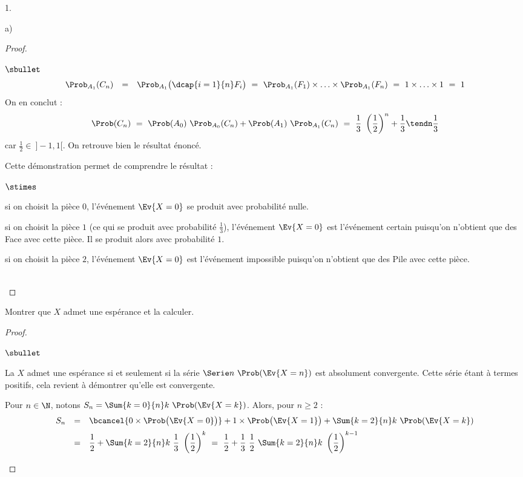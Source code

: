 \begin{noliste}{1.}
\begin{noliste}{a)}
\begin{proof}
\begin{remarkL}{.98}
\begin{noliste}{$\sbullet$}
\[\begin{array}{rcl}
            \Prob_{A_1}( C_n ) & = & \Prob_{A_1}\big( \dcap{i=1}{n} F_i
            \big) \ = \ \Prob_{A_1}(F_1) \times \ldots \times \Prob_{A_1}(F_n)
            \ = \ 1 \times \ldots \times 1 \ = \ 1
          \end{array}
          \]
          On en conclut :
          \[
          \Prob(C_n) \ = \ \Prob(A_0) \ \Prob_{A_0}(C_n) + \Prob(A_1)
          \ \Prob_{A_1}(C_n) \ = \ \dfrac{1}{3} \ \left( \dfrac{1}{2}
          \right)^n + \dfrac{1}{3} \tendn \dfrac{1}{3}
          \]
          car $\frac{1}{2} \in \ ]-1, 1[$. On retrouve bien le
          résultat énoncé.
        \item Cette démonstration permet de comprendre le résultat :
          \begin{noliste}{$\stimes$}
          \item si on choisit la pièce $0$, l'événement
            $\Ev{X = 0}$ se produit avec probabilité nulle.
          \item si on choisit la pièce $1$ (ce qui se produit avec
            probabilité $\frac{1}{3}$), l'événement $\Ev{X = 0}$ est
            l'événement certain puisqu'on n'obtient que des Face avec
            cette pièce. Il se produit alors avec probabilité $1$.
          \item si on choisit la pièce $2$, l'événement $\Ev{X = 0}$
            est l'événement impossible puisqu'on n'obtient que des
            Pile avec cette pièce.
          \end{noliste}
        \end{noliste}       
      \end{remarkL}~\\[-1.4cm]
    \end{proof}
  \end{noliste}

\item Montrer que $X$ admet une espérance et la calculer.

  \begin{proof}~%
    \begin{noliste}{$\sbullet$}
    \item La \var $X$ admet une espérance si et seulement si la série
      $\Serie n \ \Prob(\Ev{X = n})$ est absolument convergente. Cette
      série étant à termes positifs, cela revient à démontrer qu'elle
      est convergente.

    \item Pour $n \in \N$, notons $S_n = \Sum{k = 0}{n} k \
      \Prob(\Ev{X = k})$. Alors, pour $n \geq 2$ :
      \[
      \begin{array}{rcl}
        S_n & = & \bcancel{0 \times \Prob\big( \Ev{X = 0}\big)} + 1
        \times \Prob\big( \Ev{X = 1}\big) + \Sum{k = 2}{n} k \
        \Prob(\Ev{X = k}) 
        \\[.2cm]
        & = & \dfrac{1}{2} + \Sum{k = 2}{n} k \
        \dfrac{1}{3} \ \left( \dfrac{1}{2} \right)^k
        \ = \ \dfrac{1}{2} + \dfrac{1}{3} \ \dfrac{1}{2} \ \Sum{k =
          2}{n} k \ \left( \dfrac{1}{2} \right)^{k-1}
      \end{array}
      \]



\end{noliste}
\end{proof}
\end{noliste}

